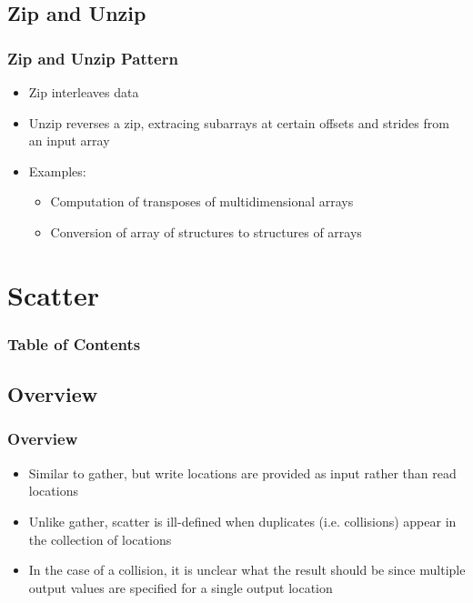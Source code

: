 \documentclass[xcolor=dvipsnames]{beamer}
\begin{document}
		\subsection*{Zip and Unzip}
		\begin{frame} \frametitle{Zip and Unzip Pattern}
			\begin{itemize}
				\item Zip interleaves data
				\item Unzip reverses a zip, extracing subarrays at certain offsets and strides from an input array
				\item Examples:
					\begin{itemize}
						\item Computation of transposes of multidimensional arrays
						\item Conversion of array of structures to structures of arrays
					\end{itemize}
			\end{itemize}
		\end{frame}
	


\section{Scatter} 

	\begin{frame} \frametitle{Table of Contents}
		\tableofcontents[currentsection]
	\end{frame} 
	
	\subsection{Overview}
	
		\begin{frame} \frametitle{Overview}
			\begin{itemize}
				\item Similar to gather, but write locations are provided as input rather than read locations
				\item Unlike gather, scatter is ill-defined when duplicates (i.e. collisions) appear in the collection of locations 
				\item In the case of a collision, it is unclear what the result should be since multiple output values are specified for a single output location
			\end{itemize}
		\end{frame}
	
\end{document}
